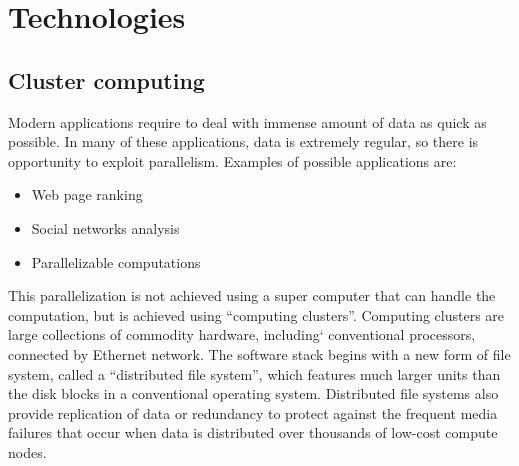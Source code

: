 \documentclass[\main/main.tex]{subfiles}
\begin{document}
\chapter{Technologies}
\section{Cluster computing}
Modern applications require to deal with immense amount of data as quick as possible. In many of these applications, data is extremely regular, so there is opportunity to exploit parallelism. Examples of possible applications are:
\begin{itemize}
    \item Web page ranking
    \item Social networks analysis
    \item Parallelizable computations
\end{itemize}
This parallelization is not achieved using a super computer that can handle the computation, but is achieved using ``computing clusters''. Computing clusters are large collections of commodity hardware, including` conventional processors, connected by Ethernet network. The software stack begins with a new form of file system, called a ``distributed file system'', which features much larger units than the disk blocks in a conventional operating system. Distributed file systems also provide replication of data or redundancy to protect against the frequent media failures that occur when data is distributed over thousands of low-cost compute nodes\cite{leskovec_rajaraman_ullman_2020}.
\end{document}
